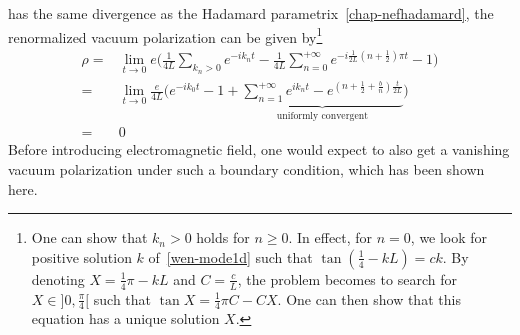 has the same divergence as the Hadamard parametrix~\cref{chap-nefhadamard}, the renormalized vacuum polarization can be given by\footnote{
One can show that $k_n > 0$ holds for $n \geq 0$. In effect, for $n = 0$, we look for positive solution $k$ of~\cref{wen-mode1d} such that $\tan(\frac 1 4 - kL) = ck$. By denoting $X = \frac 1 4 \pi - kL$ and $C = \frac c L$, the problem becomes to search for $X \in ] 0, \frac \pi 4[$ such that $\tan X = \frac 1 4 \pi C - C X$. One can then show that this equation has a unique solution $X$.
}
\begin{equation*}
\begin{split}
\rho =& \lim_{t\rightarrow 0} e \bigg(\frac{1}{4L}\sum_{k_n>0} e^{-ik_nt} 
- \frac{ 1}{ 4L}\sum_{n=0}^{+\infty} e^{-i\frac{1}{2L}(n+\frac 1 2 ) \pi t} - 1 \bigg) \\
%
= & \lim_{t\rightarrow 0 }\frac{e}{4L}\Big( e^{-ik_0t} - 1 +
\underbrace{ \sum_{n=1}^{+\infty}e^{ik_nt} - e^{(n+\frac 1 2 + \frac b n )\frac{t}{2L}} }_{\textrm{uniformly convergent}}
\Big) \\
= & 0
\end{split}
\end{equation*}
Before introducing electromagnetic field, one would expect to also get a vanishing vacuum polarization under such a boundary condition, which has been shown here.














